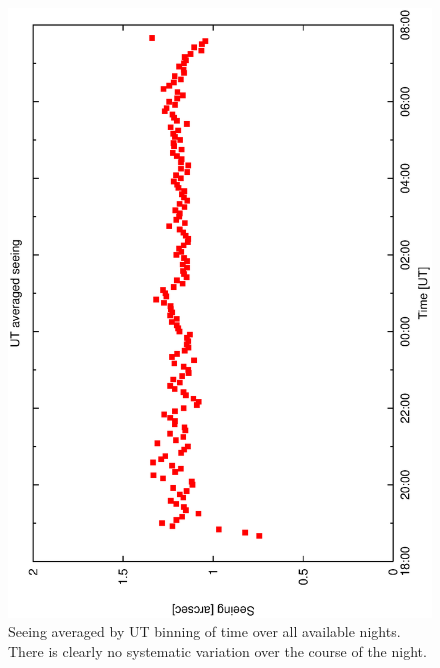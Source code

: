 {{\begin{figure}[htbp]
\begin{center}
    \includegraphics[scale=0.4, angle=-90]{figures/ecs/corr_see_ut.eps}
\end{center} 
\caption[R-band seeing averaged by UT binning of time over all available nights.]
{Seeing averaged by UT binning of time over all available nights. There is clearly no systematic variation over the course of the night.}
\label{fig:ut_av_seeing}
\end{figure}

}}
